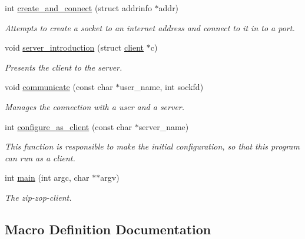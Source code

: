 \begin{DoxyCompactItemize}
int \hyperlink{zip-zop-client_8c_aff1f8c91603968e32da45fc6ef4bad4d}{create\+\_\+and\+\_\+connect} (struct addrinfo $\ast$addr)
\begin{DoxyCompactList}\small\item\em Attempts to create a socket to an internet address and connect to it in to a port. \end{DoxyCompactList}\item 
void \hyperlink{zip-zop-client_8c_acb0e43d47379736b891394dd383064be}{server\+\_\+introduction} (struct \hyperlink{structclient}{client} $\ast$c)
\begin{DoxyCompactList}\small\item\em Presents the client to the server. \end{DoxyCompactList}\item 
void \hyperlink{zip-zop-client_8c_a1c3a34b362da4351d526c8af94b228c6}{communicate} (const char $\ast$user\+\_\+name, int sockfd)
\begin{DoxyCompactList}\small\item\em Manages the connection with a user and a server. \end{DoxyCompactList}\item 
int \hyperlink{zip-zop-client_8c_a779fdc96f771120b3d34bf06ab91d58e}{configure\+\_\+as\+\_\+client} (const char $\ast$server\+\_\+name)
\begin{DoxyCompactList}\small\item\em This function is responsible to make the initial configuration, so that this program can run as a client. \end{DoxyCompactList}\item 
int \hyperlink{zip-zop-client_8c_a3c04138a5bfe5d72780bb7e82a18e627}{main} (int argc, char $\ast$$\ast$argv)
\begin{DoxyCompactList}\small\item\em The zip-\/zop-\/client. \end{DoxyCompactList}\end{DoxyCompactItemize}


\subsection{Macro Definition Documentation}
\mbox{\label{zip-zop-client_8c_aa2dfc63100e2bed7efb1b0cd09dea107}} 
